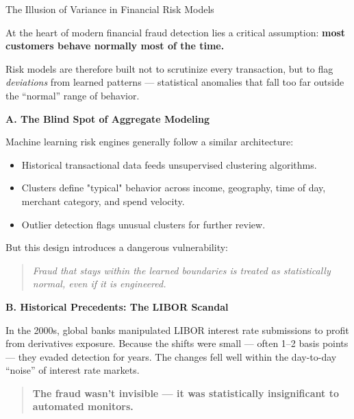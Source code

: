 \begin{HistoricalSidebar}{The Illusion of Variance in Financial Risk Models}

    At the heart of modern financial fraud detection lies a critical assumption:  
    \textbf{most customers behave normally most of the time.}
    
    \medskip
    
    Risk models are therefore built not to scrutinize every transaction, but to flag \textit{deviations} from learned patterns — statistical anomalies that fall too far outside the “normal” range of behavior.
    
    \medskip
    
    \textbf{A. The Blind Spot of Aggregate Modeling}
    
    Machine learning risk engines generally follow a similar architecture:
    
    \begin{itemize}
        \item Historical transactional data feeds unsupervised clustering algorithms.
        \item Clusters define "typical" behavior across income, geography, time of day, merchant category, and spend velocity.
        \item Outlier detection flags unusual clusters for further review.
    \end{itemize}
    
    But this design introduces a dangerous vulnerability:
    
    \begin{quote}
        \textit{Fraud that stays within the learned boundaries is treated as statistically normal, even if it is engineered.}
    \end{quote}
    
    \medskip
    
    \textbf{B. Historical Precedents: The LIBOR Scandal}
    
    In the 2000s, global banks manipulated LIBOR interest rate submissions to profit from derivatives exposure.  
    Because the shifts were small --- often 1--2 basis points --- they evaded detection for years.  
    The changes fell well within the day-to-day “noise” of interest rate markets.
    
    \begin{quote}
        \textbf{The fraud wasn’t invisible — it was statistically insignificant to automated monitors.}
    \end{quote}
    

\end{HistoricalSidebar}
